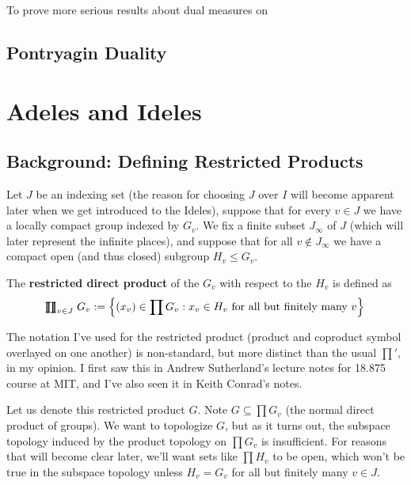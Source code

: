 \documentclass[11pt, x11names]{article}
\newcommand{\set}[1]{\left\{ #1 \right\}}
\newcommand{\rprod}{
    \mathrel{\ooalign{\hidewidth $\prod$ \hidewidth \cr $\coprod$}}
}
\begin{document}
To prove more serious results about dual measures on 

\subsection{Pontryagin Duality}
\label{subsection: Pontryagin Duality}


\newpage
\section{Adeles and Ideles}
\label{section: Adeles&Ideles}


\subsection{Background: Defining Restricted Products}
\label{subsection: Restricted Products Def}
Let $J$ be an indexing set (the reason for choosing $J$ over $I$ will become apparent
later when we get introduced to the Ideles), suppose that for every $v \in J$ we have 
a locally compact group indexed by $G_v$. We fix a finite subset $J_\infty$ of $J$ (which
will later represent the infinite places), and suppose that for all $v \notin J_\infty$
we have a compact open (and thus closed) subgroup $H_v \leq G_v$.

\begin{defn}
The \textbf{restricted direct product} of the $G_v$ with respect to the $H_v$ is defined as 
\begin{equation*}
    \rprod_{v \in J} G_v := \set{(x_v) \in \prod G_v : x_v \in H_v \text{ for all but finitely many } v}
\end{equation*}
\end{defn}

\begin{remark}
The notation I've used for the restricted product (product and coproduct symbol overlayed on one another) is non-standard, but more distinct than the usual $\prod'$, in my opinion. I first saw this in Andrew Sutherland's lecture notes for 18.875 course at MIT, and I've also seen it in Keith Conrad's notes.
\end{remark}

Let us denote this restricted product $G$. Note $G \subseteq \prod G_v$ (the normal
direct product of groups). We want to topologize $G$, but as it turns out, the subspace topology induced by the product topology on $\prod G_v$ is insufficient. For reasons that will become clear later, we'll want sets like $\prod H_v$ to be open, which won't be true in the subspace topology unless $H_v = G_v$ for all but finitely many $v \in J$.
\end{document}
